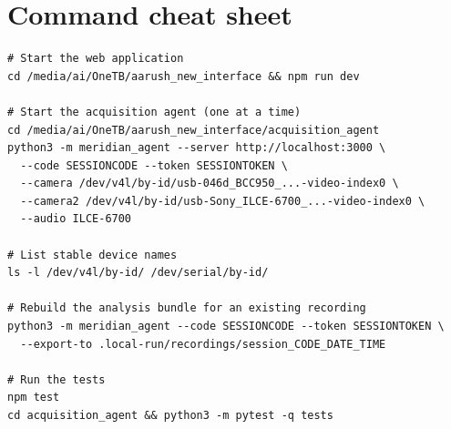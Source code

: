 \documentclass[11pt,a4paper]{article}
\begin{document}
\section{Command cheat sheet}
\begin{verbatim}
# Start the web application
cd /media/ai/OneTB/aarush_new_interface && npm run dev

# Start the acquisition agent (one at a time)
cd /media/ai/OneTB/aarush_new_interface/acquisition_agent
python3 -m meridian_agent --server http://localhost:3000 \
  --code SESSIONCODE --token SESSIONTOKEN \
  --camera /dev/v4l/by-id/usb-046d_BCC950_...-video-index0 \
  --camera2 /dev/v4l/by-id/usb-Sony_ILCE-6700_...-video-index0 \
  --audio ILCE-6700

# List stable device names
ls -l /dev/v4l/by-id/ /dev/serial/by-id/

# Rebuild the analysis bundle for an existing recording
python3 -m meridian_agent --code SESSIONCODE --token SESSIONTOKEN \
  --export-to .local-run/recordings/session_CODE_DATE_TIME

# Run the tests
npm test
cd acquisition_agent && python3 -m pytest -q tests
\end{verbatim}
\end{document}
